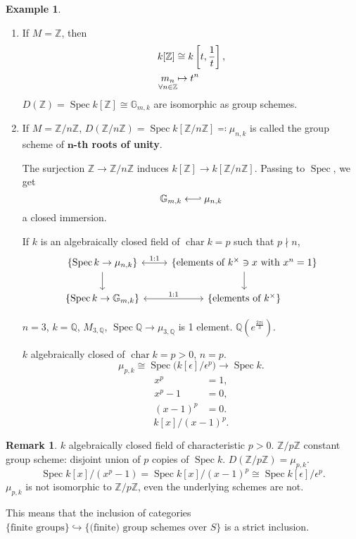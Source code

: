 \documentclass[12pt]{article}
\DeclareMathOperator{\Spec}{Spec}
\DeclareMathOperator{\chara}{char}
\theoremstyle{definition}
\newtheorem*{remark}{Remark}
\newtheorem*{example}{Example}
\theoremstyle{remark}
\begin{document}
\begin{example}
\begin{enumerate}[label=\arabic*)]
\item If $M=\mathbb{Z}$, then
\begin{align*}
k[\mathbb{Z}]&\cong k\left[t,\frac{1}{t}\right],\\
\underset{\mathclap{\forall n\in\mathbb{Z}}}{m_n}&\mapsto t^n
\end{align*}
$D(\mathbb{Z})=\Spec k[\mathbb{Z}]\cong\mathbb{G}_{m,k}$ are isomorphic as group schemes.

\item If $M=\mathbb{Z}/n\mathbb{Z}$, $D(\mathbb{Z}/n\mathbb{Z})=\Spec k[\mathbb{Z}/n\mathbb{Z}]\eqqcolon\mu_{n,k}$ is called the group scheme of \textbf{$\boldsymbol{n}$-th roots of unity}.

The surjection $\mathbb{Z}\rightarrow\mathbb{Z}/n\mathbb{Z}$ induces $k[\mathbb{Z}]\rightarrow k[\mathbb{Z}/n\mathbb{Z}]$. Passing to $\Spec$, we get
\[\mathbb{G}_{m,k}\longleftarrow\joinrel\rhook\mu_{n,k}\]
a closed immersion.

If $k$ is an algebraically closed field of $\chara k=p$ such that $p\nmid n$,
\[
\begin{tikzcd}
\{\Spec k\rightarrow\mu_{n,k}\}\arrow[r,<->,"1:1"]\arrow[d]&\{\text{elements of }k^{\times}\ni x\text{ with }x^n=1\}\arrow[d]\\
\{\Spec k\rightarrow\mathbb{G}_{m,k}\}\arrow[r,<->,"1:1"]&\{\text{elements of }k^{\times}\}
\end{tikzcd}
\]

$n=3$, $k=\mathbb{Q}$, $M_{3,\mathbb{Q}}$, $\Spec\mathbb{Q}\rightarrow\mu_{3,\mathbb{Q}}$ is 1 element. $\mathbb{Q}(e^{\frac{2\pi i}{3}})$.

$k$ algebraically closed of $\chara k=p>0$, $n=p$.
\[\mu_{p,k}\cong\Spec\big(k[\epsilon]/\epsilon^p\big)\longrightarrow\Spec k.\]
\begin{align*}
x^p&=1,\\
x^p-1&=0,\\
(x-1)^p&=0.
\end{align*}
\[k[x]/(x-1)^p.\]
\end{enumerate}
\end{example}

\begin{remark}
$k$ algebraically closed field of characteristic $p>0$. $\mathbb{Z}/p\mathbb{Z}$ constant group scheme: disjoint union of $p$ copies of $\Spec k$. $D(\mathbb{Z}/p\mathbb{Z})=\mu_{p,k}$.
\[\Spec k[x]/(x^p-1)=\Spec k[x]/(x-1)^p\cong\Spec k[\epsilon]/\epsilon^p.\]
$\mu_{p,k}$ is not isomorphic to $\mathbb{Z}/p\mathbb{Z}$, even the underlying schemes are not.

This means that the inclusion of categories $\{\text{finite groups}\}\hookrightarrow\{\text{(finite) group schemes over }S\}$ is a strict inclusion.
\end{remark}
\end{document}
